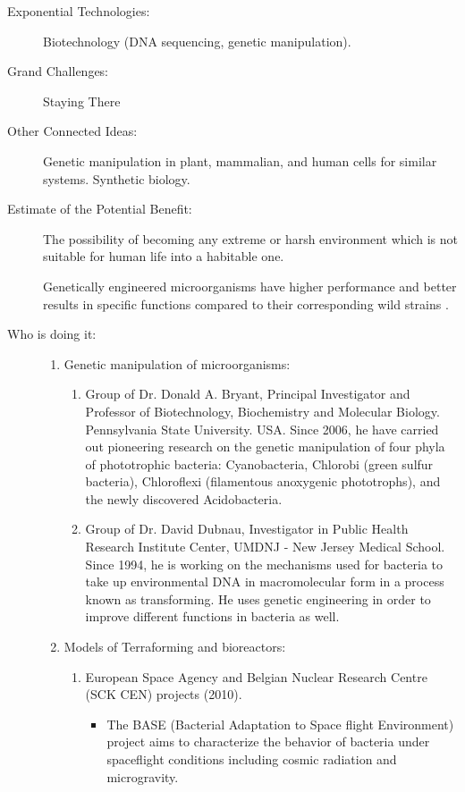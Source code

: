 \begin{description}
\item[Exponential  Technologies:]  Biotechnology (DNA sequencing, genetic manipulation).
 
\item[Grand  Challenges:] Staying  There
 
\item[Other  Connected Ideas:]  Genetic manipulation in plant, mammalian, and
human  cells for similar systems.  Synthetic biology.
 
\item[Estimate  of the Potential  Benefit:] The possibility of becoming any
extreme  or harsh environment which  is not suitable for human life into
a   habitable one.
 
Genetically  engineered  microorganisms have higher performance and
better  results in specific  functions compared to their corresponding
wild  strains \cite{Stellwag1986}.
 
\item[Who  is doing it:]
\renewcommand{\labelenumi}{\arabic{enumi}.   }
\renewcommand{\labelenumii}{(\alph{enumii})}
\hfill\begin{enumerate} 
\item Genetic manipulation of   microorganisms:
\begin{enumerate}
\item Group of Dr. Donald A. Bryant,   Principal Investigator and Professor
of   Biotechnology, Biochemistry and Molecular Biology. Pennsylvania
State  University. USA. Since 2006,  he have carried out pioneering
research   on the genetic manipulation of four phyla of phototrophic
bacteria:  Cyanobacteria, Chlorobi  (green sulfur bacteria), Chloroflexi
(filamentous   anoxygenic phototrophs), and the newly discovered
Acidobacteria.
 
\item Group of Dr. David Dubnau,   Investigator in Public Health Research
Institute   Center, UMDNJ - New Jersey Medical School. Since 1994, he is
working  on the mechanisms used for  bacteria to take up environmental
DNA  in  macromolecular form in a process known as transforming. He uses
genetic  engineering in order to  improve different functions in
bacteria   as well.
 \end{enumerate}
\item Models of Terraforming and   bioreactors:
 \begin{enumerate}
\item  European Space  Agency and Belgian  Nuclear Research Centre (SCK CEN)
projects   (2010).
 \begin{itemize}
\item  The BASE (Bacterial Adaptation   to Space flight Environment)
project   aims to characterize the behavior of bacteria under
spaceflight  conditions including  cosmic radiation and microgravity.
 

\end{itemize}
\end{enumerate}
\end{enumerate}
\end{description}
